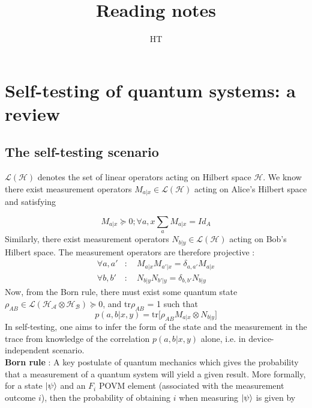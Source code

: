 \documentclass[12pt]{article}
\author{HT}
\title{Reading notes}
\begin{document}
\maketitle

\tableofcontents

\vspace{2cm}


\section{Self-testing of quantum systems: a review
\cite{2020-self-testing-a-review}}

\subsection{The self-testing scenario}

$\mathscr{L(H)}$ denotes the set of linear operators acting on Hilbert space
$\mathscr H$. We know there exist measurement operators $M_{a|x} \in
\mathscr{L(H)}$ acting on Alice's Hilbert space and satisfying

\begin{equation}
	M_{a|x} \succcurlyeq 0 ; \forall a, x \sum_a M_{a|x} = Id_A
\end{equation}
Similarly, there exist measurement operators $N_{b|y} \in \mathscr{L(H)}$ acting
on Bob's Hilbert space. The measurement operators are therefore projective :
\begin{equation}
	\begin{aligned}
		\forall a, a' & : \quad M_{a|x}M_{a'|x} = \delta_{a, a'}M_{a|x} \\
		\forall b, b' & : \quad N_{b|y}N_{b'|y} = \delta_{b, b'}N_{b|y}
	\end{aligned}
\end{equation}
Now, from the Born rule, there must exist some quantum state $\rho_{AB} \in
\mathscr{L(H_\text{A} \otimes H_\text{B})} \succcurlyeq 0$, and tr$\rho_{AB}$ =
1 such that
\begin{equation}
	p(a,b|x,y) = \text{tr}\big[\rho_{AB} M_{a|x} \otimes N_{b|y} \big]
\end{equation}
In self-testing, one aims to infer the form of the state and the measurement in
the trace from knowledge of the correlation $p(a, b|x, y)$ alone, i.e. in
device-independent scenario.
\\\noindent
\textbf{Born rule} : A key postulate of quantum mechanics which gives the
probability that a measurement of a quantum system will yield a given result.
More formally, for a state $\ket{\psi}$ and an $F_i$ POVM element (associated
with the measurement outcome $i$), then the probability of obtaining $i$ when
measuring $\ket{\psi}$ is given by
\end{document}
